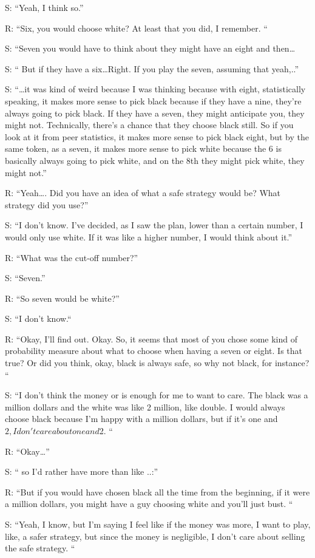S: “Yeah, I think so.”

R: “Six, you would choose white? At least that you did, I remember. “

S: “Seven you would have to think about they might have an eight and then…

S: “ But if they have a six…Right. If you play the seven, assuming that yeah,..”

S: “…it was kind of weird because I was thinking because with eight, statistically speaking, it makes more sense to pick black because if they have a nine, they're always going to pick black. If they have a seven, they might anticipate you, they might not. Technically, there's a chance that they choose black still. So if you look at it from peer statistics, it makes more sense to pick black eight, but by the same token, as a seven, it makes more sense to pick white because the 6 is basically always going to pick white, and on the 8th they might pick white, they might not.”

R: “Yeah…. Did you have an idea of what a safe strategy would be? What strategy did you use?”

S: “I don't know. I've decided, as I saw the plan, lower than a certain number, I would only use white. If it was like a higher number, I would think about it.”

R: “What was the cut-off number?”

S: “Seven.”

R: “So seven would be white?”

S: “I don't know.“

R: “Okay, I'll find out. Okay. So, it seems that most of you chose some kind of probability measure about what to choose when having a seven or eight. Is that true? Or did you think, okay, black is always safe, so why not black, for instance? “

S: “I don't think the money or is enough for me to want to care. The black was a million dollars and the white was like 2 million, like double. I would always choose black because I'm happy with a million dollars, but if it's one and $2, I don't care about one and $2. “

R: “Okay…”

S: “ so I'd rather have more than like ..:”

R: “But if you would have chosen black all the time from the beginning, if it were a million dollars, you might have a guy choosing white and you'll just bust. “

S: “Yeah, I know, but I'm saying I feel like if the money was more, I want to play, like, a safer strategy, but since the money is negligible, I don't care about selling the safe strategy. “ %

